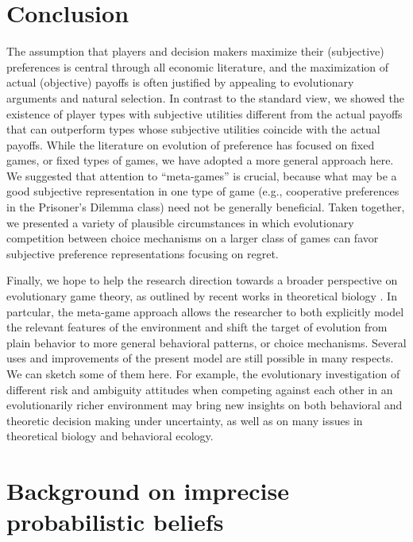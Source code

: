 \documentclass[fleqn,reqno,11pt]{article}
\begin{document}
\section{Conclusion} \label{sec:conclusion}


The assumption that players and decision makers maximize their (subjective) preferences is central through all economic literature, and the maximization of actual (objective) payoffs is often justified by appealing to evolutionary arguments and natural
selection. In contrast to the standard view, we showed the
existence of player types with subjective utilities different
from the actual payoffs that can outperform types whose
subjective utilities coincide with the actual payoffs.
While the literature on evolution of preference has focused
on fixed games, or fixed types of games, we have adopted a
more general approach here. We suggested that attention
to “meta-games” is crucial, because what may be a good
subjective representation in one type of game (e.g., cooperative preferences in the Prisoner’s Dilemma class) need not
be generally beneficial. Taken together, we presented a variety of plausible circumstances in which evolutionary competition between choice
mechanisms on a larger class of games can favor subjective
preference representations focusing on regret.

Finally, we hope to help the research direction towards a broader perspective on evolutionary game theory, as outlined by recent works in theoretical biology \citep[e.g.,][]{FawcettHamblin2013:Exposing-the-be}. In partcular, the meta-game approach allows the researcher to both explicitly model the relevant features of the environment and shift the target of evolution from plain behavior to more general behavioral patterns, or choice mechanisms.
Several uses and improvements of the present model are still possible in many respects. We can sketch some of them here. For example, the evolutionary investigation of different risk and ambiguity attitudes when competing against each other in an evolutionarily richer environment may bring new insights on both behavioral and theoretic decision making under uncertainty, as well as on many issues in theoretical biology and behavioral ecology.


\appendix

\section{Background on imprecise probabilistic beliefs}
\label{sec:impr-prob-beli}
\end{document}
